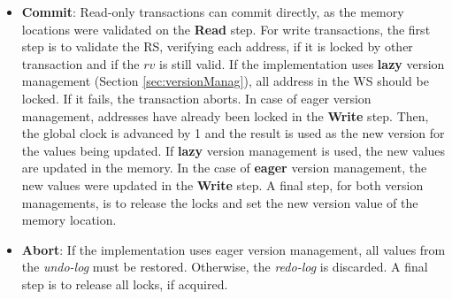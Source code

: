 \begin{itemize}
	
	\item \textbf{Commit}: 
Read-only transactions can commit directly, as the memory locations were validated on the \textbf{Read} step.
 For write transactions, the first step is to validate the RS, verifying each address, if it is locked by other transaction and if the $rv$ is still valid.
If the implementation uses \textbf{lazy} version management (Section \ref{sec:versionManag}), all address in the WS should be locked. If it fails, the transaction aborts. In case of eager version management, addresses have already been locked in the \textbf{Write} step.
Then, the global clock is advanced by 1 and the result is used as the new version for the values being updated. If \textbf{lazy} version management is used, the new values are updated in the memory. In the case of \textbf{eager} version management, the new values were updated in the \textbf{Write} step.
A final step, for both version managements, is to release the locks and set the new version value of the memory location.
	
	
	
	
	\item \textbf{Abort}: If the implementation uses eager version management, all values from the \emph{undo-log} must be restored. Otherwise, the \emph{redo-log} is discarded. 
A final step is to release all locks, if acquired.
\end{itemize}

